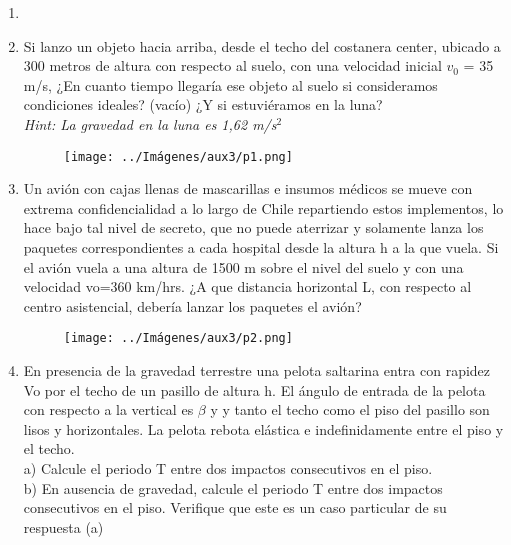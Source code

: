 \documentclass[letterpaper,11pt]{article}
\begin{document}
\vspace{-1cm}
\begin{enumerate}\setlength{\itemsep}{0.4cm}


\item[]

\item Si lanzo un objeto hacia arriba, desde el techo del costanera center, ubicado a 300 metros de altura con respecto al suelo, con una velocidad inicial $v_0$ = 35 m/s, ¿En cuanto tiempo llegaría ese objeto al suelo si consideramos condiciones ideales? (vacío) ¿Y si estuviéramos en la luna?\\
\textit{Hint: La gravedad en la luna es 1,62 m/s$^2$}

\begin{figure}[h!]
        \centering
        \texttt{[image: ../Imágenes/aux3/p1.png]}
    \end{figure}


\item Un avión con cajas llenas de mascarillas e insumos médicos se mueve con extrema confidencialidad a lo largo de Chile repartiendo estos implementos, lo hace bajo tal nivel de secreto, que no puede aterrizar y solamente lanza los paquetes correspondientes a cada hospital desde la altura h a la que vuela. Si el avión vuela a una altura de 1500 m sobre el nivel del suelo y con una velocidad vo=360 km/hrs. ¿A que distancia horizontal L, con respecto al centro asistencial, debería lanzar los paquetes el avión?
    
   \begin{figure}[h!]
        \centering
        \texttt{[image: ../Imágenes/aux3/p2.png]}
    \end{figure} 
    
\newpage
    
\item  En presencia de la gravedad terrestre una pelota saltarina entra con rapidez Vo por el techo de un pasillo de altura h. El ángulo de entrada de la pelota con respecto a la vertical es 
$\beta$ y y tanto el techo como el piso del pasillo son lisos y horizontales. La pelota rebota elástica e indefinidamente entre el piso y el techo.\\

a) Calcule el periodo T entre dos impactos consecutivos en el piso.\\
        
b) En ausencia de gravedad, calcule el periodo T entre dos impactos consecutivos en el piso. Verifique que este es un caso particular de su respuesta (a) \\


\end{enumerate}
\end{document}
